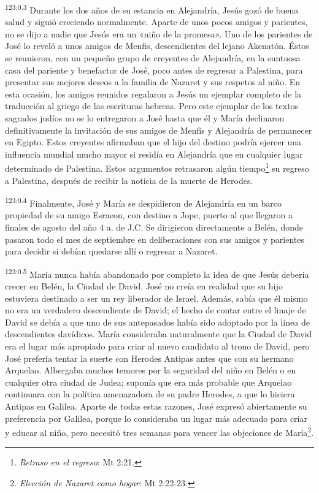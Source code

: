 \par
\textsuperscript{123:0.3} Durante los dos años de su estancia en Alejandría, Jesús gozó de buena salud y siguió creciendo normalmente. Aparte de unos pocos amigos y parientes, no se dijo a nadie que Jesús era un «niño de la promesa». Uno de los parientes de José lo reveló a unos amigos de Menfis, descendientes del lejano Akenatón. Éstos se reunieron, con un pequeño grupo de creyentes de Alejandría, en la suntuosa casa del pariente y benefactor de José, poco antes de regresar a Palestina, para presentar sus mejores deseos a la familia de Nazaret y sus respetos al niño. En esta ocasión, los amigos reunidos regalaron a Jesús un ejemplar completo de la traducción al griego de las escrituras hebreas. Pero este ejemplar de los textos sagrados judíos no se lo entregaron a José hasta que él y María declinaron definitivamente la invitación de sus amigos de Menfis y Alejandría de permanecer en Egipto. Estos creyentes afirmaban que el hijo del destino podría ejercer una influencia mundial mucho mayor si residía en Alejandría que en cualquier lugar determinado de Palestina. Estos argumentos retrasaron algún tiempo\footnote{\textit{Retraso en el regreso}: Mt 2:21.} su regreso a Palestina, después de recibir la noticia de la muerte de Herodes.

\par
\textsuperscript{123:0.4} Finalmente, José y María se despidieron de Alejandría en un barco propiedad de su amigo Esraeon, con destino a Jope, puerto al que llegaron a finales de agosto del año 4 a. de J.C. Se dirigieron directamente a Belén, donde pasaron todo el mes de septiembre en deliberaciones con sus amigos y parientes para decidir si debían quedarse allí o regresar a Nazaret.

\par
\textsuperscript{123:0.5} María nunca había abandonado por completo la idea de que Jesús debería crecer en Belén, la Ciudad de David. José no creía en realidad que su hijo estuviera destinado a ser un rey liberador de Israel. Además, sabía que él mismo no era un verdadero descendiente de David; el hecho de contar entre el linaje de David se debía a que uno de sus antepasados había sido adoptado por la línea de descendientes davídicos. María consideraba naturalmente que la Ciudad de David era el lugar más apropiado para criar al nuevo candidato al trono de David, pero José prefería tentar la suerte con Herodes Antipas antes que con su hermano Arquelao. Albergaba muchos temores por la seguridad del niño en Belén o en cualquier otra ciudad de Judea; suponía que era más probable que Arquelao continuara con la política amenazadora de su padre Herodes, a que lo hiciera Antipas en Galilea. Aparte de todas estas razones, José expresó abiertamente su preferencia por Galilea, porque lo consideraba un lugar más adecuado para criar y educar al niño, pero necesitó tres semanas para vencer las objeciones de María\footnote{\textit{Elección de Nazaret como hogar}: Mt 2:22-23.}.

